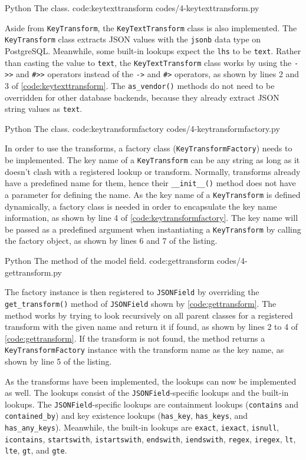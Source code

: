 \listing
{Python}
{The  class.}
{code:keytexttransform}
{codes/4-keytexttransform.py}

Aside from \verb|KeyTransform|, the \verb|KeyTextTransform| class is also
implemented. The \verb|KeyTransform| class extracts JSON values with the
\verb|jsonb| data type on PostgreSQL. Meanwhile, some built-in lookups expect
the \verb|lhs| to be \verb|text|. Rather than casting the value to \verb|text|,
the \verb|KeyTextTransform| class works by using the \verb|->>| and \verb|#>>|
operators instead of the \verb|->| and \verb|#>| operators, as shown by lines 2
and 3 of \autoref{code:keytexttransform}. The \verb|as_vendor()| methods do not
need to be overridden for other database backends, because they already extract
JSON string values as \verb|text|.

\listing
{Python}
{The  class.}
{code:keytransformfactory}
{codes/4-keytransformfactory.py}

In order to use the transforms, a factory class (\verb|KeyTransformFactory|)
needs to be implemented. The key name of a \verb|KeyTransform| can be any
string as long as it doesn't clash with a registered lookup or transform.
Normally, transforms already have a predefined name for them, hence their
\verb|__init__()| method does not have a parameter for defining the name. As
the key name of a \verb|KeyTransform| is defined dynamically, a factory class
is needed in order to encapsulate the key name information, as shown by line 4
of \autoref{code:keytransformfactory}. The key name will be passed as a
predefined argument when instantiating a \verb|KeyTransform| by calling the
factory object, as shown by lines 6 and 7 of the listing.

\listing
{Python}
{The  method of the  model field.}
{code:gettransform}
{codes/4-gettransform.py}

The factory instance is then registered to \verb|JSONField| by overriding the
\verb|get_transform()| method of \verb|JSONField| shown by
\autoref{code:gettransform}. The method works by trying to look recursively on
all parent classes for a registered transform with the given name and return it
if found, as shown by lines 2 to 4 of \autoref{code:gettransform}. If the
transform is not found, the method returns a \verb|KeyTransformFactory|
instance with the transform name as the key name, as shown by line 5 of the
listing.

As the transforms have been implemented, the lookups can now be implemented as
well. The lookups consist of the \verb|JSONField|-specific lookups and the
built-in lookups. The \verb|JSONField|-specific lookups are containment lookups
(\verb|contains| and \verb|contained_by|) and key existence lookups
(\verb|has_key|, \verb|has_keys|, and \verb|has_any_keys|). Meanwhile, the
built-in lookups are \verb|exact|, \verb|iexact|, \verb|isnull|,
\verb|icontains|, \verb|startswith|, \verb|istartswith|, \verb|endswith|,
\verb|iendswith|, \verb|regex|, \verb|iregex|, \verb|lt|, \verb|lte|,
\verb|gt|, and \verb|gte|.

